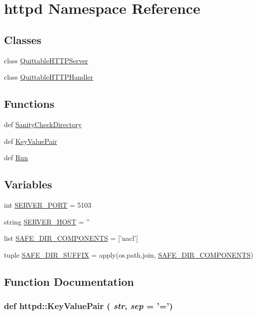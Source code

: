 \hypertarget{namespacehttpd}{
\section{httpd Namespace Reference}
\label{namespacehttpd}
}
\subsection*{Classes}
\begin{DoxyCompactItemize}
\item 
class \hyperlink{classhttpd_1_1_quittable_h_t_t_p_server}{QuittableHTTPServer}
\item 
class \hyperlink{classhttpd_1_1_quittable_h_t_t_p_handler}{QuittableHTTPHandler}
\end{DoxyCompactItemize}
\subsection*{Functions}
\begin{DoxyCompactItemize}
\item 
def \hyperlink{namespacehttpd_a6da503c6b97f5225addf690d831ef5e0}{SanityCheckDirectory}
\item 
def \hyperlink{namespacehttpd_a3c11eb6d34c8df05eb513a1a7dda72f4}{KeyValuePair}
\item 
def \hyperlink{namespacehttpd_abbb72598ee3e6bc16815e9545faadb4b}{Run}
\end{DoxyCompactItemize}
\subsection*{Variables}
\begin{DoxyCompactItemize}
\item 
int \hyperlink{namespacehttpd_adc0117d0e36bf6be6b386f2a2655418c}{SERVER\_\-PORT} = 5103
\item 
string \hyperlink{namespacehttpd_a23df9da5d521d9876f39e179ccb8e056}{SERVER\_\-HOST} = ''
\item 
list \hyperlink{namespacehttpd_a20bf8bb90b3f20597551ccd964a4807d}{SAFE\_\-DIR\_\-COMPONENTS} = \mbox{[}'nacl'\mbox{]}
\item 
tuple \hyperlink{namespacehttpd_aa9c232e22e2a0f42b96ad04b3b3a9e84}{SAFE\_\-DIR\_\-SUFFIX} = apply(os.path.join, \hyperlink{namespacehttpd_a20bf8bb90b3f20597551ccd964a4807d}{SAFE\_\-DIR\_\-COMPONENTS})
\end{DoxyCompactItemize}


\subsection{Function Documentation}
\hypertarget{namespacehttpd_a3c11eb6d34c8df05eb513a1a7dda72f4}{
\subsubsection[{KeyValuePair}]{\setlength{\rightskip}{0pt plus 5cm}def httpd::KeyValuePair ( {\em str}, \/   {\em sep} = {\ttfamily '='})}}
\label{namespacehttpd_a3c11eb6d34c8df05eb513a1a7dda72f4}


